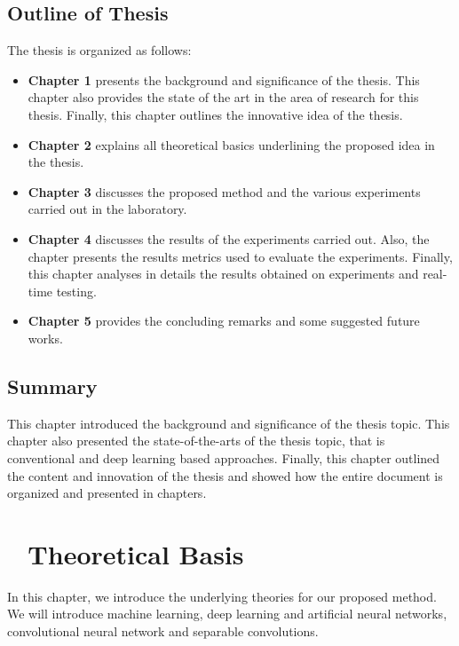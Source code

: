 \documentclass[master]{thesis-uestc}
\begin{document}
\section{Outline of Thesis}
The thesis is organized as follows:
\begin{itemize}
    \item \textbf{Chapter 1} presents the background and significance of the thesis. This chapter also provides the state of the art in the area of research for this thesis. Finally, this chapter outlines the innovative idea of the thesis.
    \item \textbf{Chapter 2} explains all theoretical basics underlining the proposed idea in the thesis.
    \item \textbf{Chapter 3} discusses the proposed method and the various experiments carried out in the laboratory.
    \item \textbf{Chapter 4} discusses the results of the experiments carried out. Also, the chapter presents the results metrics used to evaluate the experiments. Finally, this chapter analyses in details the results obtained on experiments and real-time testing.
    \item \textbf{Chapter 5} provides the concluding remarks and some suggested future works.
\end{itemize}

\section{Summary}
This chapter introduced the background and significance of the thesis topic. This chapter also presented the state-of-the-arts of the thesis topic, that is conventional and deep learning based approaches. Finally, this chapter outlined the content and innovation of the thesis and showed how the entire document is organized and presented in chapters. 

\chapter{\,\,\,\,\,\textbf{Theoretical Basis}}
In this chapter, we introduce the underlying theories for our proposed method. We will introduce machine learning, deep learning and artificial neural networks, convolutional neural network and separable convolutions.
\end{document}
